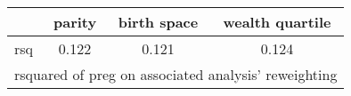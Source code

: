 \begin{tabular}{l*{3}{c}}
\toprule
            &\multicolumn{1}{c}{parity}&\multicolumn{1}{c}{birth space}&\multicolumn{1}{c}{wealth quartile}\\
\midrule
\midrule
rsq         &       0.122&       0.121&       0.124\\
\bottomrule
\multicolumn{4}{l}{\footnotesize rsquared of preg on associated analysis' reweighting}\\
\end{tabular}
